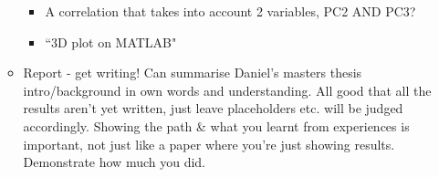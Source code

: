 \documentclass{article}
\begin{document}
\begin{itemize}
\begin{itemize}
        \begin{itemize}
            \item A correlation that takes into account 2 variables, PC2 AND PC3? 
            \item ``3D plot on MATLAB"
        \end{itemize}
        \item Report - get writing! Can summarise Daniel's masters thesis intro/background in own words and understanding. All good that all the results aren't yet written, just leave placeholders etc. will be judged accordingly. Showing the path \& what you learnt from experiences is important, not just like a paper where you're just showing results. Demonstrate how much you did.
    \end{itemize}
\end{itemize}
\end{document}
